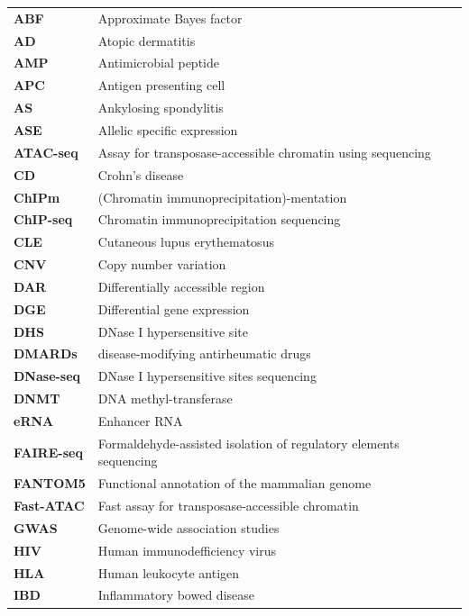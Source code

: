 \begin{longtable}{p{2.5cm}p{12.5cm}}
\textbf{ABF} & Approximate Bayes factor\\
\textbf{AD} & Atopic dermatitis \\
\textbf{AMP} & Antimicrobial peptide\\
\textbf{APC} &Antigen presenting cell \\
\textbf{AS} & Ankylosing spondylitis\\
\textbf{ASE} & Allelic specific expression \\
\textbf{ATAC-seq} & Assay for transposase-accessible chromatin using sequencing \\
\textbf{CD} & Crohn's disease\\
\textbf{ChIPm} & (Chromatin immunoprecipitation)-mentation  \\
\textbf{ChIP-seq} & Chromatin immunoprecipitation sequencing\\
\textbf{CLE} & Cutaneous lupus erythematosus \\
\textbf{CNV} & Copy number variation\\
\textbf{DAR} & Differentially accessible region  \\
\textbf{DGE} & Differential gene expression\\
\textbf{DHS} & DNase I hypersensitive site\\
\textbf{DMARDs} & disease-modifying antirheumatic drugs \\
\textbf{DNase-seq} & DNase I hypersensitive sites sequencing\\
\textbf{DNMT} & DNA methyl-transferase\\
\textbf{eRNA} & Enhancer RNA\\
\textbf{FAIRE-seq} & Formaldehyde-assisted isolation of regulatory elements sequencing \\
\textbf{FANTOM5} & Functional annotation of the mammalian genome\\
\textbf{Fast-ATAC} & Fast  assay for transposase-accessible chromatin \\
\textbf{GWAS} & Genome-wide association studies \\
\textbf{HIV} & Human immunodefficiency virus\\
\textbf{HLA} & Human leukocyte antigen\\
\textbf{IBD} & Inflammatory bowed disease\\

\end{longtable}
